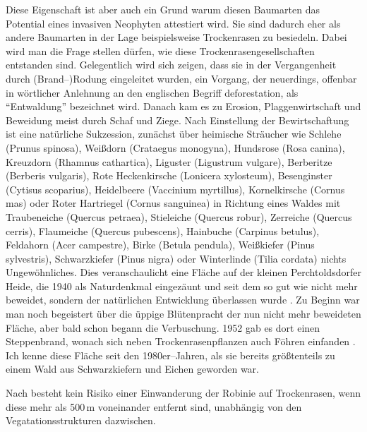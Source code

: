 \documentclass[twocolumn]{scrartcl}
\begin{document}
Diese Eigenschaft ist aber auch ein Grund warum diesen Baumarten das Potential
eines invasiven Neophyten attestiert wird. Sie sind dadurch eher als andere
Baumarten in der Lage beispielsweise Trockenrasen zu besiedeln. Dabei wird man
die Frage stellen dürfen, wie diese Trockenrasengesellschaften entstanden sind.
Gelegentlich wird sich zeigen, dass sie in der Vergangenheit durch
(Brand\mbox{--)}Rodung eingeleitet wurden, ein Vorgang, der neuerdings, offenbar
in wörtlicher Anlehnung an den englischen Begriff deforestation, als
\enquote{Entwaldung} bezeichnet wird. Danach kam es zu Erosion,
Plaggenwirtschaft und Beweidung meist durch Schaf und Ziege. Nach Einstellung
der Bewirtschaftung ist eine natürliche Sukzession, zunächst über heimische
Sträucher wie Schlehe (Prunus spinosa), Weißdorn (Crataegus monogyna), Hundsrose
(Rosa canina), Kreuzdorn (Rhamnus cathartica), Liguster (Ligustrum vulgare),
Berberitze (Berberis vulgaris), Rote Heckenkirsche (Lonicera xylosteum),
Besenginster (Cytisus scoparius), Heidelbeere (Vaccinium myrtillus),
Kornelkirsche (Cornus mas) oder Roter Hartriegel (Cornus sanguinea) in Richtung
eines Waldes mit Traubeneiche (Quercus petraea), Stieleiche (Quercus robur),
Zerreiche (Quercus cerris), Flaumeiche (Quercus pubescens), Hainbuche (Carpinus
betulus), Feldahorn (Acer campestre), Birke (Betula pendula), Weißkiefer (Pinus
sylvestris), Schwarzkiefer (Pinus nigra) oder Winterlinde (Tilia cordata) nichts
Ungewöhnliches. Dies veranschaulicht eine Fläche auf der kleinen
Perchtoldsdorfer Heide, die 1940 als Naturdenkmal eingezäunt und seit dem so gut
wie nicht mehr beweidet, sondern der natürlichen Entwicklung überlassen wurde
\citep{rosenkranz1953heide}. Zu Beginn war man noch begeistert über die üppige
Blütenpracht der nun nicht mehr beweideten Fläche, aber bald schon begann die
Verbuschung. 1952 gab es dort einen Steppenbrand, wonach sich neben
Trockenrasenpflanzen auch Föhren einfanden \citep{rosenkranz1953heideBrand}. Ich
kenne diese Fläche seit den 1980er--Jahren, als sie bereits größtenteils zu
einem Wald aus Schwarzkiefern und Eichen geworden war.

Nach \citet[S.~134]{landeck2022robinie} besteht kein Risiko einer
Einwanderung der Robinie auf Trockenrasen, wenn diese mehr als 500\,m
voneinander entfernt sind, unabhängig von den Vegatationsstrukturen
dazwischen.
\end{document}
